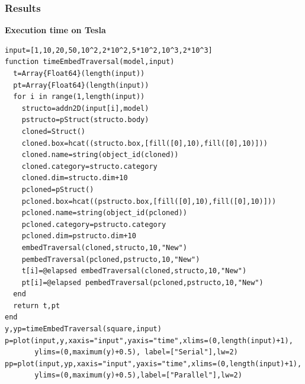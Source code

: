\documentclass[a4paper,12pt]{article}
\begin{document}
\subsubsection{Results}
\textbf{Execution time on Tesla}
\begin{Verbatim}[fontsize=\footnotesize]
input=[1,10,20,50,10^2,2*10^2,5*10^2,10^3,2*10^3]
function timeEmbedTraversal(model,input)
  t=Array{Float64}(length(input))
  pt=Array{Float64}(length(input))
  for i in range(1,length(input))
    structo=addn2D(input[i],model)
    pstructo=pStruct(structo.body)
    cloned=Struct()
    cloned.box=hcat((structo.box,[fill([0],10),fill([0],10)]))
    cloned.name=string(object_id(cloned))
    cloned.category=structo.category
    cloned.dim=structo.dim+10
    pcloned=pStruct()
    pcloned.box=hcat((pstructo.box,[fill([0],10),fill([0],10)]))
    pcloned.name=string(object_id(pcloned))
    pcloned.category=pstructo.category
    pcloned.dim=pstructo.dim+10
    embedTraversal(cloned,structo,10,"New")
    pembedTraversal(pcloned,pstructo,10,"New")
    t[i]=@elapsed embedTraversal(cloned,structo,10,"New")
    pt[i]=@elapsed pembedTraversal(pcloned,pstructo,10,"New")
  end
  return t,pt
end
y,yp=timeEmbedTraversal(square,input)
p=plot(input,y,xaxis="input",yaxis="time",xlims=(0,length(input)+1),
       ylims=(0,maximum(y)+0.5), label=["Serial"],lw=2)       
pp=plot(input,yp,xaxis="input",yaxis="time",xlims=(0,length(input)+1),
       ylims=(0,maximum(y)+0.5),label=["Parallel"],lw=2)      
\end{Verbatim}
\end{document}
